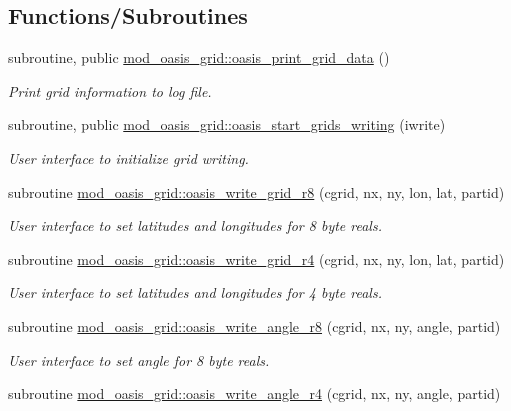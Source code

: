 \subsection*{Functions/\+Subroutines}
\begin{DoxyCompactItemize}
\item 
subroutine, public \hyperlink{namespacemod__oasis__grid_a4bc230ba4aa317f666bdab2416b4f6da}{mod\+\_\+oasis\+\_\+grid\+::oasis\+\_\+print\+\_\+grid\+\_\+data} ()
\begin{DoxyCompactList}\small\item\em Print grid information to log file. \end{DoxyCompactList}\item 
subroutine, public \hyperlink{namespacemod__oasis__grid_acb0569d8677f0762559ed6b211945d9b}{mod\+\_\+oasis\+\_\+grid\+::oasis\+\_\+start\+\_\+grids\+\_\+writing} (iwrite)
\begin{DoxyCompactList}\small\item\em User interface to initialize grid writing. \end{DoxyCompactList}\item 
subroutine \hyperlink{namespacemod__oasis__grid_a61a1b9209b5012b58fadf2a79284e1e7}{mod\+\_\+oasis\+\_\+grid\+::oasis\+\_\+write\+\_\+grid\+\_\+r8} (cgrid, nx, ny, lon, lat, partid)
\begin{DoxyCompactList}\small\item\em User interface to set latitudes and longitudes for 8 byte reals. \end{DoxyCompactList}\item 
subroutine \hyperlink{namespacemod__oasis__grid_a74137e0541f8a9e2b1f05918b7f8da17}{mod\+\_\+oasis\+\_\+grid\+::oasis\+\_\+write\+\_\+grid\+\_\+r4} (cgrid, nx, ny, lon, lat, partid)
\begin{DoxyCompactList}\small\item\em User interface to set latitudes and longitudes for 4 byte reals. \end{DoxyCompactList}\item 
subroutine \hyperlink{namespacemod__oasis__grid_a5ffeb1d150d305f2868114faf7ebddb2}{mod\+\_\+oasis\+\_\+grid\+::oasis\+\_\+write\+\_\+angle\+\_\+r8} (cgrid, nx, ny, angle, partid)
\begin{DoxyCompactList}\small\item\em User interface to set angle for 8 byte reals. \end{DoxyCompactList}\item 
subroutine \hyperlink{namespacemod__oasis__grid_aa4f44626552980d5418d77447e1ce058}{mod\+\_\+oasis\+\_\+grid\+::oasis\+\_\+write\+\_\+angle\+\_\+r4} (cgrid, nx, ny, angle, partid)

\end{DoxyCompactItemize}
